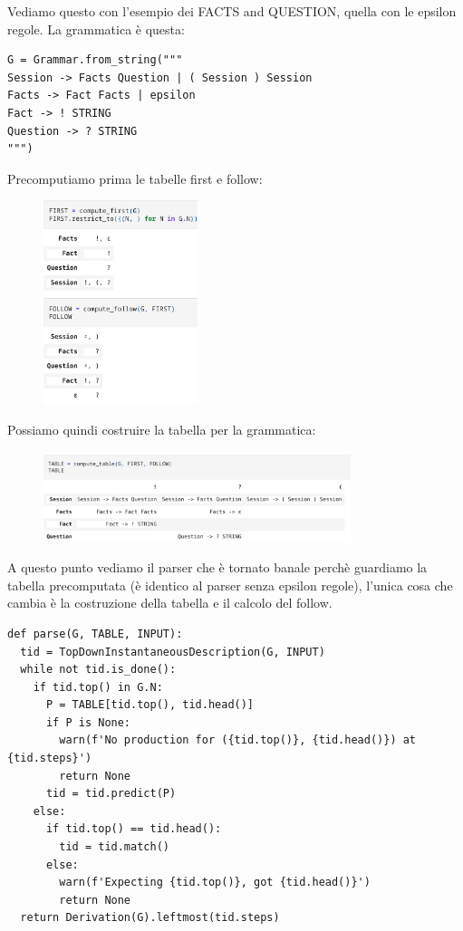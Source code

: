 Vediamo questo con l'esempio dei FACTS and QUESTION, quella con le epsilon regole. La grammatica è questa:
\begin{lstlisting}
G = Grammar.from_string("""
Session -> Facts Question | ( Session ) Session
Facts -> Fact Facts | epsilon
Fact -> ! STRING
Question -> ? STRING
""")
\end{lstlisting}

\newpage

Precomputiamo prima le tabelle first e follow:

\begin{figure}[ht!]
  \centering
  \includegraphics[width=0.4\textwidth]{images/Parsing/firstFollowEs.png}
\end{figure}

Possiamo quindi costruire la tabella per la grammatica:
\begin{figure}[ht!]
  \centering
  \includegraphics[width=0.8\textwidth]{images/Parsing/tableFirstFollow.png}
\end{figure}

A questo punto vediamo il parser che è tornato banale perchè guardiamo la tabella precomputata (è identico al parser senza epsilon regole), l'unica cosa che cambia è la costruzione della tabella e il calcolo del follow.
\begin{lstlisting}
def parse(G, TABLE, INPUT):
  tid = TopDownInstantaneousDescription(G, INPUT)
  while not tid.is_done():
    if tid.top() in G.N:
      P = TABLE[tid.top(), tid.head()]
      if P is None:
        warn(f'No production for ({tid.top()}, {tid.head()}) at {tid.steps}')
        return None 
      tid = tid.predict(P)
    else:
      if tid.top() == tid.head():
        tid = tid.match()
      else:
        warn(f'Expecting {tid.top()}, got {tid.head()}')
        return None   
  return Derivation(G).leftmost(tid.steps)
\end{lstlisting}

